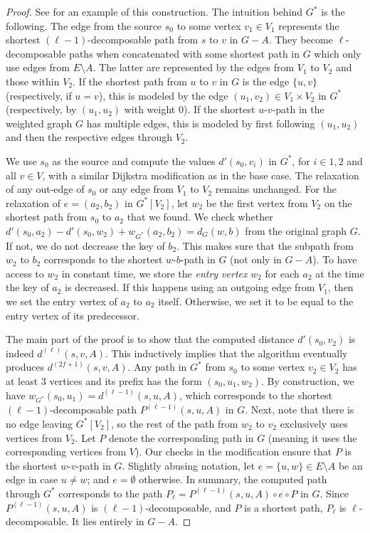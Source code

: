 \documentclass{theoretics}
\begin{document}
\begin{proof}
See  for an example of this construction.
The intuition behind $G^*$ is the following.
The edge from the source $s_0$ to some vertex $v_1 \in V_1$ represents the shortest $(\ell{-}1)$-decomposable path from $s$ to $v$ in $G{-}A$.
They become $\ell$-decomposable paths when concatenated with some shortest path in $G$ which only use edges from $E{\setminus}A$.
The latter are represented by the edges from $V_1$ to $V_2$ and those within $V_2$.
If the shortest path from $u$ to $v$ in $G$ is the edge $\{u,v\}$ (respectively, if $u = v$),
this is modeled by the edge $(u_1,v_2) \in V_1 \times V_2$ in $G^*$(respectively, by $(u_1,u_2)$ with weight $0$).
If the shortest $u$-$v$-path in the weighted graph $G$ has multiple edges, 
this is modeled by first following $(u_1,u_2)$ and then the respective edges through $V_2$.

We use $s_0$ as the source and compute the values $d'(s_0,v_i)$ in $G^*$, for $i \in {1,2}$ and all $v \in V$,
with a similar Dijkstra modification as in the base case.
The relaxation of any out-edge of $s_0$ or any edge from $V_1$ to $V_2$ remains unchanged.
For the relaxation of  $e = (a_2,b_2)$ in $G^*[V_2]$,
let $w_2$ be the first vertex from $V_2$ on the shortest path from $s_0$ to $a_2$ that we found. 
We check whether $d'(s_0, a_2) - d'(s_0, w_2) + w_{G^*}(a_2,b_2) = d_G(w,b)$
from the original graph $G$.
If not, we do not decrease the key of $b_2$.
This makes sure that the subpath from $w_2$ to $b_2$
corresponds to the shortest $w$-$b$-path in $G$ (not only in $G-A$).
To have access to $w_2$ in constant time, we store the \emph{entry vertex} $w_2$ for each $a_2$ at the time the key of $a_2$ is decreased.
If this happens using an outgoing edge from $V_1$, then we set the entry vertex of $a_2$ to $a_2$ itself.
Otherwise, we set it to be equal to the entry vertex of its predecessor.

The main part of the proof is to show that the computed distance $d'(s_0,v_2)$ 
is indeed $d^{(\ell)}(s, v, A)$.
This inductively implies that the algorithm eventually produces $d^{(2f+1)}(s,v,A)$.
%
Any path in $G^*$ from $s_0$ to some vertex $v_2 \in V_2$ has at least $3$ vertices
and its prefix has the form $(s_0, u_1, w_2)$.
By construction, we have $w_{G^*}(s_0,u_1)=d^{(\ell-1)}(s, u, A)$,
which corresponds to the shortest $(\ell{-}1)$-de\-com\-pos\-able path $P^{(\ell-1)}(s,u,A)$ in $G$.
Next, note that there is no edge leaving $G^*[V_2]$,
so the rest of the path from $w_2$ to $v_2$ exclusively uses vertices from $V_2$.
Let $P$ denote the corresponding path in $G$ (meaning it uses the corresponding vertices from $V$).
Our checks in the modification ensure that $P$ is the shortest $w$-$v$-path in $G$.
Slightly abusing notation, let $e  = \{u,w\} \in E{\setminus}A$ be an edge in case $u \neq w$;
and $e = \emptyset$ otherwise.
In summary, the computed path through $G^*$
corresponds to the path $P_{\ell} = P^{(\ell-1)}(s, u, A) \circ e \circ P$ in $G$.
Since $P^{(\ell-1)}(s, u, A)$ is $(\ell{-}1)$-decomposable, and $P$ is a shortest path,
$P_{\ell}$ is $\ell$-decomposable.
It lies entirely in $G{-}A$.


\end{proof}
\end{document}
